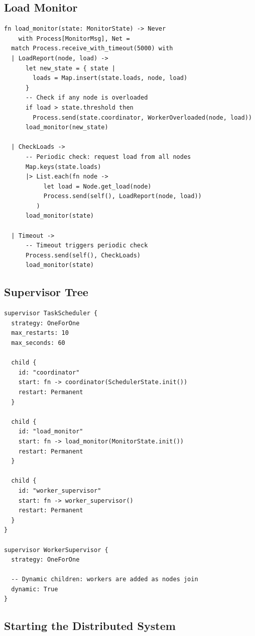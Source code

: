 \documentclass[11pt,a4paper]{article}
\begin{document}
\subsection{Load Monitor}

\begin{lstlisting}
fn load_monitor(state: MonitorState) -> Never
    with Process[MonitorMsg], Net =
  match Process.receive_with_timeout(5000) with
  | LoadReport(node, load) ->
      let new_state = { state |
        loads = Map.insert(state.loads, node, load)
      }
      -- Check if any node is overloaded
      if load > state.threshold then
        Process.send(state.coordinator, WorkerOverloaded(node, load))
      load_monitor(new_state)

  | CheckLoads ->
      -- Periodic check: request load from all nodes
      Map.keys(state.loads)
      |> List.each(fn node ->
           let load = Node.get_load(node)
           Process.send(self(), LoadReport(node, load))
         )
      load_monitor(state)

  | Timeout ->
      -- Timeout triggers periodic check
      Process.send(self(), CheckLoads)
      load_monitor(state)
\end{lstlisting}

\subsection{Supervisor Tree}

\begin{lstlisting}
supervisor TaskScheduler {
  strategy: OneForOne
  max_restarts: 10
  max_seconds: 60

  child {
    id: "coordinator"
    start: fn -> coordinator(SchedulerState.init())
    restart: Permanent
  }

  child {
    id: "load_monitor"
    start: fn -> load_monitor(MonitorState.init())
    restart: Permanent
  }

  child {
    id: "worker_supervisor"
    start: fn -> worker_supervisor()
    restart: Permanent
  }
}

supervisor WorkerSupervisor {
  strategy: OneForOne

  -- Dynamic children: workers are added as nodes join
  dynamic: True
}
\end{lstlisting}

\subsection{Starting the Distributed System}
\end{document}
